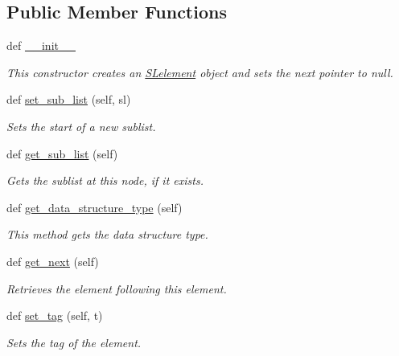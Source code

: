 \subsection*{Public Member Functions}
\begin{DoxyCompactItemize}
\item 
def \hyperlink{class_bridges_1_1_m_lelement_1_1_m_lelement_aa5bd9eaf5ccfcf031dd4d776d4332802}{\+\_\+\+\_\+init\+\_\+\+\_\+}
\begin{DoxyCompactList}\small\item\em This constructor creates an \hyperlink{namespace_bridges_1_1_s_lelement}{S\+Lelement} object and sets the next pointer to null. \end{DoxyCompactList}\item 
def \hyperlink{class_bridges_1_1_m_lelement_1_1_m_lelement_a621bc963cf3cd0638fe2bc887ad3d1b3}{set\+\_\+sub\+\_\+list} (self, sl)
\begin{DoxyCompactList}\small\item\em Sets the start of a new sublist. \end{DoxyCompactList}\item 
def \hyperlink{class_bridges_1_1_m_lelement_1_1_m_lelement_a6e90fc95e186efee921d6dfe1c4e9e94}{get\+\_\+sub\+\_\+list} (self)
\begin{DoxyCompactList}\small\item\em Gets the sublist at this node, if it exists. \end{DoxyCompactList}\item 
def \hyperlink{class_bridges_1_1_m_lelement_1_1_m_lelement_a9b7a6ee7ff5c9e7a57aa5e88983c0a8e}{get\+\_\+data\+\_\+structure\+\_\+type} (self)
\begin{DoxyCompactList}\small\item\em This method gets the data structure type. \end{DoxyCompactList}\item 
def \hyperlink{class_bridges_1_1_m_lelement_1_1_m_lelement_ad1bb911d71086b8b27cd4d76eebcde05}{get\+\_\+next} (self)
\begin{DoxyCompactList}\small\item\em Retrieves the element following this element. \end{DoxyCompactList}\item 
def \hyperlink{class_bridges_1_1_m_lelement_1_1_m_lelement_a25d6a2e4524e4427b9f540fc41d44508}{set\+\_\+tag} (self, t)
\begin{DoxyCompactList}\small\item\em Sets the tag of the element. \end{DoxyCompactList}\item 

\end{DoxyCompactItemize}
